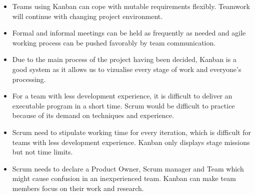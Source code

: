 \documentclass[titlepage]{article}
\begin{document}
\begin{itemize}
\item Teams using Kanban can cope with mutable requirements flexibly. Teamwork will continue with changing project environment.
\item Formal and informal meetings can be held as frequently as needed and agile working process can be pushed favorably by team communication.
\item Due to the main process of the project having been decided, Kanban is a good system as it allows us to vizualise every stage of work and everyone’s processing.
\item For a team with less development experience, it is difficult to deliver an executable program in a short time. Scrum would be difficult to practice because of its demand on techniques and experience.
\item Scrum need to stipulate working time for every iteration, which is difficult for teams with less development experience. Kanban only displays stage missions but not time limits.
\item Scrum needs to declare a Product Owner, Scrum manager and Team which might cause confusion in an inexperienced team. Kanban can make team members focus on their work and research.
\end{itemize}

\pagebreak
{}
 
\end{document}

